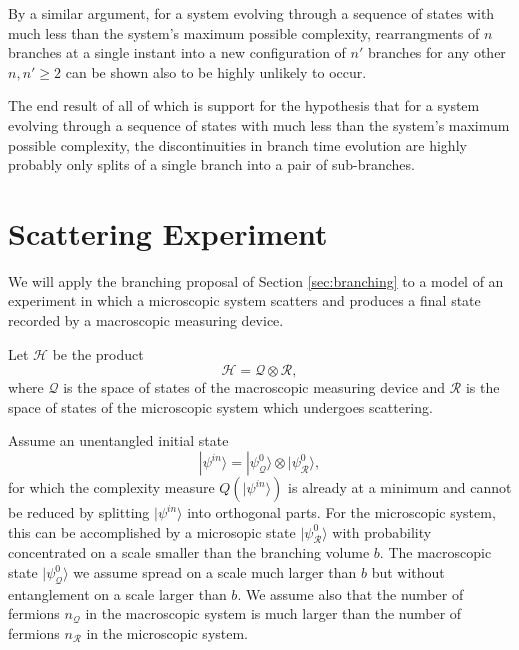 \documentclass[12pt,amsmath,amssymb,onecolumn]{revtex4-2}
\begin{document}
By a similar argument, for a system evolving through
a sequence of states with much less than the system's maximum
possible complexity,
rearrangments of $n$ branches
at a single instant into a new configuration of $n'$ branches
for any other $n, n' \ge 2$
can be shown also to be highly unlikely to occur.

The end result of all of which is
support for
the hypothesis that
for a system evolving
through a sequence of states
with much less
than the system's maximum possible complexity,
the discontinuities
in branch time evolution are
highly probably only splits of a single
branch into a pair of sub-branches.

\section{\label{sec:scattering} Scattering Experiment}

We will apply the branching proposal of Section \ref{sec:branching} to a
model of an experiment in which a microscopic system scatters and produces a final
state recorded by a macroscopic measuring device.

Let $\mathcal{H}$ be the product
\begin{equation}
\label{macromicro}
\mathcal{H} = \mathcal{Q} \otimes \mathcal{R},
\end{equation}
where $\mathcal{Q}$ is the space of states of the macroscopic measuring
device and $\mathcal{R}$ is the space of states of the microscopic
system which undergoes scattering.

Assume an unentangled initial state
\begin{equation}
\label{initialstate}
|\psi^{in} \rangle  = |\psi^0_{\mathcal{Q}} \rangle  \otimes |\psi^0_{\mathcal{R}} \rangle ,
\end{equation}
for which the complexity measure $Q( |\psi^{in} \rangle )$ is already at
a minimum and cannot be reduced by splitting $|\psi^{in} \rangle $ into
orthogonal parts. For the microscopic system, this
can be accomplished by a microsopic state $|\psi^0_{\mathcal{R}} \rangle $
with probability concentrated on a
scale smaller than the branching volume $b$. The macroscopic
state $|\psi^0_{\mathcal{Q}} \rangle $ we assume spread on a scale much
larger than $b$ but without entanglement on a scale larger than $b$.
We assume also that the number of fermions $n_{\mathcal{Q}}$ in
the macroscopic system is much larger than the number
of fermions $n_{\mathcal{R}}$ in the microscopic system.
\end{document}
